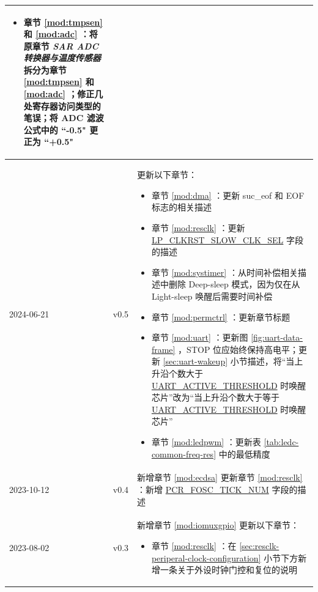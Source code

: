 \begin{longtable}[l]{ | m{2cm} | m{1.5cm} | m{12cm} | }
\begin{itemize}
        \item 章节 \ref{mod:tmpsen} \textit{\nameref{mod:tmpsen}} 和 \ref{mod:adc} \textit{\nameref{mod:adc}}：将原章节 \textit{SAR ADC 转换器与温度传感器} 拆分为章节 \ref{mod:tmpsen} \textit{\nameref{mod:tmpsen}} 和 \ref{mod:adc} \textit{\nameref{mod:adc}}；修正几处寄存器访问类型的笔误；将 ADC 滤波公式中的 ``-0.5" 更正为 ``+0.5" %
    \end{itemize}
    \\\hline
    2024-06-21 & v0.5 &
    更新以下章节：
    \begin{itemize}
        \item 章节 \ref{mod:dma} \textit{\nameref{mod:dma}}：更新 suc\_eof 和 EOF 标志的相关描述 %
        \item 章节 \ref{mod:resclk} \textit{\nameref{mod:resclk}}：更新 \hyperref[fielddesc:LPCLKRSTSLOWCLKSEL]{LP\_CLKRST\_SLOW\_CLK\_SEL} 字段的描述
        \item 章节 \ref{mod:systimer} \textit{\nameref{mod:systimer}}：从时间补偿相关描述中删除 Deep-sleep 模式，因为仅在从 Light-sleep 唤醒后需要时间补偿 %
        \item 章节 \ref{mod:permctrl} \textit{\nameref{mod:permctrl}}：更新章节标题
        \item 章节 \ref{mod:uart} \textit{\nameref{mod:uart}}：更新图 \ref{fig:uart-data-frame} \textit{\nameref{fig:uart-data-frame}}，STOP 位应始终保持高电平；更新 \ref{sec:uart-wakeup} 小节描述，将“当上升沿个数大于 \hyperref[fielddesc:UARTACTIVETHRESHOLD]{UART\_ACTIVE\_THRESHOLD} 时唤醒芯片”改为“当上升沿个数大于等于 \hyperref[fielddesc:UARTACTIVETHRESHOLD]{UART\_ACTIVE\_THRESHOLD} 时唤醒芯片” %
        \item 章节 \ref{mod:ledpwm} \textit{\nameref{mod:ledpwm}}：更新表 \ref{tab:ledc-common-freq-res} 中的最低精度  %
    \end{itemize}
    \\\hline
    2023-10-12 & v0.4 &
    新增章节 \ref{mod:ecdsa} \textit{\nameref{mod:ecdsa}} \newline
    更新章节 \ref{mod:resclk} \textit{\nameref{mod:resclk}}：新增 \hyperref[fielddesc:PCRFOSCTICKNUM]{PCR\_FOSC\_TICK\_NUM} 字段的描述
    \\\hline
    2023-08-02             & v0.3 &
    新增章节 \ref{mod:iomuxgpio} \textit{\nameref{mod:iomuxgpio}} \newline
    更新以下章节：
    \begin{itemize}
        \item 章节 \ref{mod:resclk} \textit{\nameref{mod:resclk}}：在 \ref{sec:resclk-periperal-clock-configuration} 小节下方新增一条关于外设时钟门控和复位的说明 %

\end{itemize}
\end{longtable}
